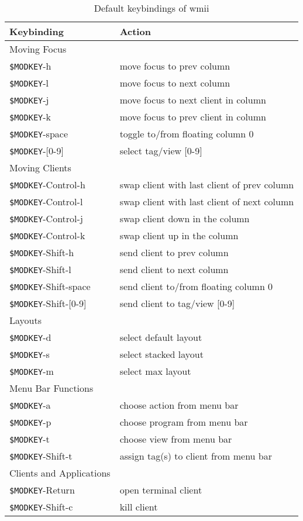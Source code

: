\documentclass[12pt,a4paper]{article} %
\begin{document}
    \begin{table}[h]
      \begin{tabular}{|l|l|}
        \hline %
        Keybinding &Action \\ %
        \hline 
        \hline 
        Moving Focus&\\
        \verb+$MODKEY+-h&move focus to prev column \\
        \verb+$MODKEY+-l&move focus to next column \\
        \verb+$MODKEY+-j&move focus to next client in column \\
        \verb+$MODKEY+-k&move focus to prev client in column \\
        \verb+$MODKEY+-space&toggle to/from floating column 0 \\
        \verb+$MODKEY+-[0-9]&select tag/view [0-9] \\
        Moving Clients&\\
        \verb+$MODKEY+-Control-h&swap client with last client of prev column \\
        \verb+$MODKEY+-Control-l&swap client with last client of next column \\
        \verb+$MODKEY+-Control-j&swap client down in the column \\
        \verb+$MODKEY+-Control-k&swap client up in the column \\
        \verb+$MODKEY+-Shift-h&send client to prev column \\
        \verb+$MODKEY+-Shift-l&send client to next column \\
        \verb+$MODKEY+-Shift-space&send client to/from floating column 0 \\
        \verb+$MODKEY+-Shift-[0-9]&send client to tag/view [0-9] \\
        Layouts&\\
        \verb+$MODKEY+-d&select default layout \\
        \verb+$MODKEY+-s&select stacked layout \\
        \verb+$MODKEY+-m&select max layout \\
        Menu Bar Functions&\\
        \verb+$MODKEY+-a&choose action from menu bar \\
        \verb+$MODKEY+-p&choose program from menu bar \\
        \verb+$MODKEY+-t&choose view from menu bar \\
        \verb+$MODKEY+-Shift-t&assign tag(s)  to client from menu bar \\
        Clients and Applications&\\
        \verb+$MODKEY+-Return&open terminal client \\
        \verb+$MODKEY+-Shift-c&kill client \\
        \hline 
      \end{tabular} 
      \caption{Default keybindings of wmii} 
    \end{table}
\end{document}

